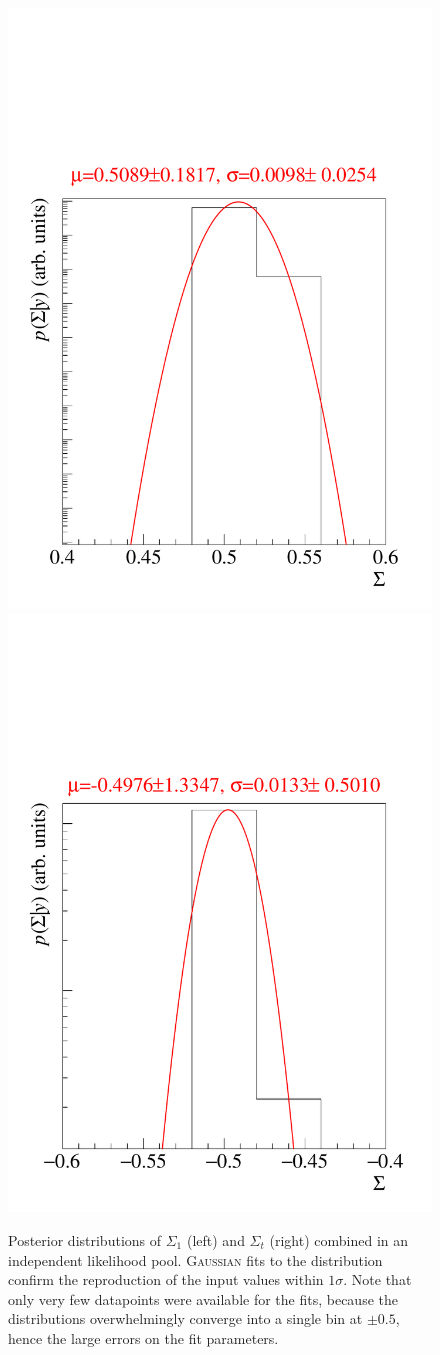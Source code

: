 \begin{figure}[htbp]
	\includegraphics[width=.49\linewidth]{../bayes/etap_event_based_fit/plots/combined_post_mul.pdf}
	\includegraphics[width=.49\linewidth]{../bayes/etap_event_based_fit/plots/combined_post_mul_bkg.pdf}
	\caption{Posterior distributions of $\Sigma_1$ (left) and $\Sigma_t$ (right) combined in an independent likelihood pool. \textsc{Gaussian} fits to the distribution confirm the reproduction of the input values within $1\sigma$. Note that only very few datapoints were available for the fits, because the distributions overwhelmingly converge into a single bin at $\pm0.5$, hence the large errors on the fit parameters.}
	\label{fig:applik}
\end{figure}





